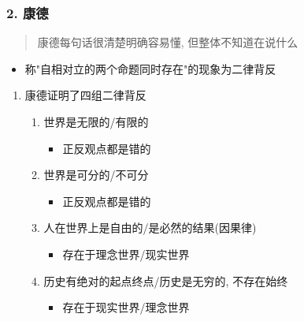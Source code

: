 \documentclass[11pt]{article}
\begin{document}
\subsubsection{2. 康德}
\label{sec:orgb73fa40}
\begin{quote}
康德每句话很清楚明确容易懂, 但整体不知道在说什么
\end{quote}
\begin{itemize}
\item 称"自相对立的两个命题同时存在"的现象为二律背反
\end{itemize}
\begin{enumerate}
\item 康德证明了四组二律背反
\label{sec:org13fbda5}
\begin{enumerate}
\item 世界是无限的/有限的
\begin{itemize}
\item 正反观点都是错的
\end{itemize}
\item 世界是可分的/不可分
\begin{itemize}
\item 正反观点都是错的
\end{itemize}
\item 人在世界上是自由的/是必然的结果(因果律)
\begin{itemize}
\item 存在于理念世界/现实世界
\end{itemize}
\item 历史有绝对的起点终点/历史是无穷的, 不存在始终
\begin{itemize}
\item 存在于现实世界/理念世界
\end{itemize}
\end{enumerate}
\end{enumerate}
\end{document}
